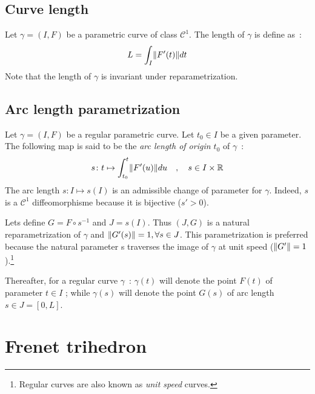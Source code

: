 \subsection{Curve length}
Let $\gamma=(I,F)$ be a parametric curve of class ${\mathcal{C}}^{1}$. The length of $\gamma$ is define as~:
\begin{equation}
	L=\int_{I}\lVert F'(t)\rVert dt
\end{equation}
Note that the length of $\gamma$ is invariant under reparametrization.

\subsection{Arc length parametrization}
Let $\gamma=(I,F)$ be a regular parametric curve. Let $t_0 \in I$ be a given parameter. The following map is said to be the \emph{arc length of origin $t_0$} of $\gamma$~:
\begin{equation}
	s \colon t \mapsto \int_{t_{0}}^{t}\lVert F'(u)\rVert du
	\quad,\quad
	s \in I \times \mathbb{R}
\end{equation}
The arc length $s \colon I\mapsto s(I)$ is an admissible change of parameter for $\gamma$. Indeed, $s$ is a ${\mathcal{C}}^{1}$ diffeomorphisme because it is bijective ($s'>0$).

Lets define $G=F\circ s^{-1}$ and $J=s(I)$. Thus $(J,G)$ is a natural reparametrization of $\gamma$ and  $\lVert G'(s)\rVert = 1, \forall s \in J$. This parametrization is preferred because the natural parameter s traverses the image of $\gamma$ at unit speed ($\lVert G'\rVert = 1$).\footnote{Regular curves are also known as \emph{unit speed} curves.}

Thereafter, for a regular curve $\gamma$~: $\gamma(t)$ will denote the point $F(t)$ of parameter $t \in I$ ; while $\gamma(s)$ will denote the point $G(s)$ of arc length $s \in J=[0,L]$.


\section{Frenet trihedron}\label{sec:frenettrihedron}


